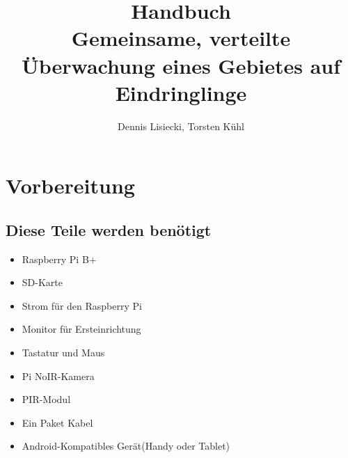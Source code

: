\documentclass[12pt,a4paper]{scrreprt}
\title{Handbuch \\ Gemeinsame, verteilte Überwachung eines Gebietes auf Eindringlinge}
\author{Dennis Lisiecki, Torsten Kühl}
\begin{document}
\maketitle	%
\tableofcontents	%


\chapter{Vorbereitung}

\section{Diese Teile werden benötigt}
\begin{itemize}
\item Raspberry Pi B+
\item SD-Karte
\item Strom für den Raspberry Pi
\item Monitor für Ersteinrichtung
\item Tastatur und Maus
\item Pi NoIR-Kamera
\item PIR-Modul
\item Ein Paket Kabel
\item Android-Kompatibles Gerät(Handy oder Tablet)
\end{itemize}
\end{document}
